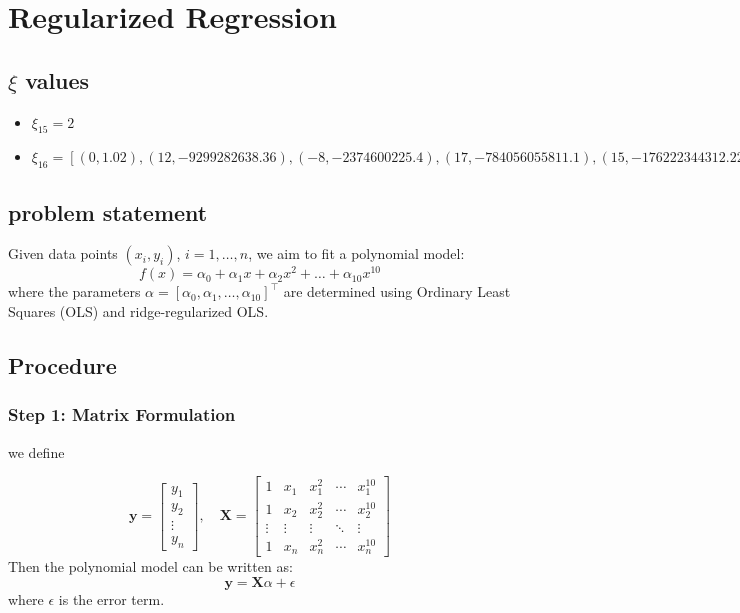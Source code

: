 \chapter{Regularized Regression}

\section*{$\xi$ values}

\begin{itemize}
    \item $\xi_{15} = 2$
    \item $\xi_{16} = [(0, 1.02), (12, -9299282638.36), (-8, -2374600225.4), (17, -784056055811.1), (15, -176222344312.22), (14, -77014229782.37), (-3, -242303.46), (-5, -29761762.12), (16, -395181197747.31), (-9, -7127287542.33), (-14, -497500330338.83), (19, -2721304154318.83), (11, -1711787290.93), (-11, -49788893865.47), (2, 6283.6), (-1, 6.22), (13, -28608967709.78), (-4, -3469152.41), (-18, -5623069099766.66), (-6, -164648910.44), (-7, -676910624.02), (20, -4903055842230.23)]$
\end{itemize}

\section{problem statement}
Given data points $(x_i, y_i)$, $i = 1, \dots, n$, we aim to fit a polynomial model:
\begin{equation}
f(x) = \alpha_0 + \alpha_1 x + \alpha_2 x^2 + \dots + \alpha_{10} x^{10}
\end{equation}
where the parameters $\alpha = [\alpha_0, \alpha_1, \dots, \alpha_{10}]^\top$ are determined using Ordinary Least Squares (OLS) and ridge-regularized OLS.

\section{Procedure}
\subsection*{Step 1: Matrix Formulation}
we define

\begin{equation}
\mathbf{y} = 
\begin{bmatrix}
y_1 \\
y_2 \\
\vdots \\
y_n
\end{bmatrix}, \quad
\mathbf{X} = 
\begin{bmatrix}
1 & x_1 & x_1^2 & \cdots & x_1^{10} \\
1 & x_2 & x_2^2 & \cdots & x_2^{10} \\
\vdots & \vdots & \vdots & \ddots & \vdots \\
1 & x_n & x_n^2 & \cdots & x_n^{10}
\end{bmatrix}
\end{equation}
Then the polynomial model can be written as:
\begin{equation}
\mathbf{y} = \mathbf{X} \alpha + \epsilon
\end{equation}
where $\epsilon$ is the error term.

